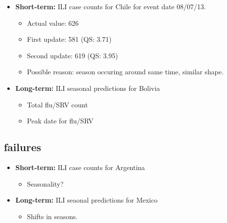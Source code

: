 \begin{itemize}
  \item {\bf Short-term:} ILI case counts for Chile for event date 08/07/13.
    \begin{itemize}
      \item Actual value: 626
      \item First update: 581 (QS: 3.71)
      \item Second update: 619 (QS: 3.95)
      \item Possible reason: season occuring around same time, similar shape.
    \end{itemize}

  \item {\bf Long-term:} ILI seasonal predictions for Bolivia
    \begin{itemize}
      \item Total flu/SRV count
      \item Peak date for flu/SRV
    \end{itemize}
\end{itemize}

\subsection{failures}

\begin{itemize}
  \item {\bf Short-term:} ILI case counts for Argentina
    \begin{itemize}
      \item Seasonality?
    \end{itemize}
  \item {\bf Long-term:} ILI seaonal predictions for Mexico
    \begin{itemize}
      \item Shifts in seasons. 
    \end{itemize}
\end{itemize}

